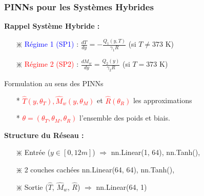 \documentclass[handout]{beamer}
\newtheorem{pbm et hypo}[thm]{Problématique et hypothèses}
\begin{document}
	\begin{frame}
		\frametitle{PINNs pour les Systèmes Hybrides}
		\textbf{Rappel Système Hybride :}
		\begin{itemize}
			\item[$\divideontimes$] \textcolor{blue}{Régime 1 (SP1)} : 
			$\frac{dT}{dy} = -\frac{Q_1(y,T)}{\gamma_1 R}$  \hfill (si $T \neq 373$ K)
			\item[$\divideontimes$] \textcolor{red}{Régime 2 (SP2)} : 
			$\frac{dM_w}{dy} = \frac{Q_2(y)}{\gamma_2 R}$  \hfill (si $T = 373$ K)
		\end{itemize}
		
		\begin{block}{Formulation au sens des PINNs}\pause
			\begin{itemize}
				\item[*] 	\textcolor{red}{$ \hat{T}(y, \theta_T), \hat{M}_w(y, \theta_M)$} et \textcolor{red}{$\hat{R}( \theta_R)$} les approximations %
				\item[*] \textcolor{red}{$\theta = (\theta_T, \theta_M, \theta_R) $} l'ensemble des poids et biais. %
			\end{itemize}
		\end{block}
		
		\textbf{Structure du Réseau :}
		\begin{itemize}
			\item[$\divideontimes$] Entrée ($y \in [0,12m]$) $\Rightarrow$ nn.Linear(1, 64), nn.Tanh(), 
			\item[$\divideontimes$] 2 couches cachées nn.Linear(64, 64), nn.Tanh(),
			\item[$\divideontimes$] Sortie ($\hat{T}$, $\hat{M}_w$, $\hat{R}$) $\Rightarrow$ nn.Linear(64, 1) 
		\end{itemize}
	\end{frame}
	
\end{document}
